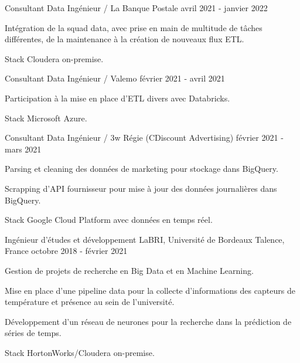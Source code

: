 \begin{cventries}
	\cventry
	{Consultant Data Ingénieur / La Banque Postale}{}{}
	{avril 2021 - janvier 2022}
	{
		\begin{cvitems}
			\item Intégration de la squad data, avec prise en main de multitude de tâches différentes, de la maintenance à la création de nouveaux flux ETL.
			\item Stack Cloudera on-premise.
		\end{cvitems}
	}
	
	\cventry
	{Consultant Data Ingénieur / Valemo}{}{}
	{février 2021 - avril 2021}
	{
		\begin{cvitems}
			\item Participation à la mise en place d'ETL divers avec Databricks.
			\item Stack Microsoft Azure.
		\end{cvitems}
	}
	
	\cventry
	{Consultant Data Ingénieur / 3w Régie (CDiscount Advertising)}{}{}
	{février 2021 - mars 2021}
	{
		\begin{cvitems}
			\item Parsing et cleaning des données de marketing pour stockage dans BigQuery.
			\item Scrapping d'API fournisseur pour mise à jour des données journalières dans BigQuery.
			\item Stack Google Cloud Platform avec données en temps réel.
		\end{cvitems}
	}
	
	\cventry
	{Ingénieur d'études et développement}
	{LaBRI, Université de Bordeaux}
	{Talence, France}
	{octobre 2018 - février 2021}
	{
		\begin{cvitems}
			\item Gestion de projets de recherche en Big Data et en Machine Learning.
			\item Mise en place d'une pipeline data pour la collecte d'informations des capteurs de température et présence au sein de l'université.
			\item Développement d'un réseau de neurones pour la recherche dans la prédiction de séries de temps.
			\item Stack HortonWorks/Cloudera on-premise.
		\end{cvitems}
	}
	
\end{cventries}